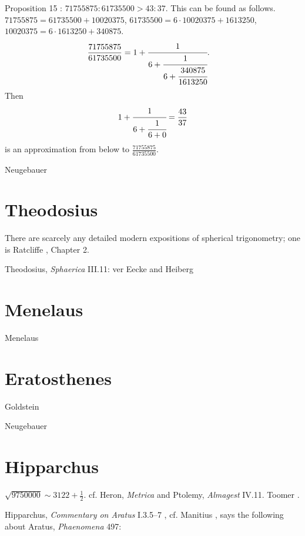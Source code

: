 \documentclass{article}
\theoremstyle{definition}
\begin{document}
Proposition 15 \cite[p.~407]{aristarchus}: $71755875:61735500>43:37$. This can be found as follows. 
$71755875 = 61735500+10020375$, $61735500 = 6\cdot 10020375 + 1613250$, $10020375 = 6\cdot 1613250+340875$. 
\begin{align*}
\frac{71755875}{61735500}&=1+\cfrac{1}{6+\cfrac{1}{6+\cfrac{340875}{1613250}}}.
\end{align*}
Then 
\[
1+\cfrac{1}{6+\cfrac{1}{6+0}}=\frac{43}{37}
\]
is an approximation from below to $\frac{71755875}{61735500}$. 



Neugebauer \cite{HAMA}







\section{Theodosius}
There are scarcely any detailed modern expositions of spherical trigonometry; one is Ratcliffe \cite{ratcliffe}, Chapter 2.



Theodosius, {\em Sphaerica} III.11: ver Eecke \cite{theodosius} and Heiberg \cite{heiberg1927}





\section{Menelaus}
Menelaus \cite{menelaos}







\section{Eratosthenes}
Goldstein \cite{goldstein}

Neugebauer \cite[pp.~336, 746--748]{HAMA}





\section{Hipparchus}
$\sqrt{9750000} \sim 3122 + \frac{1}{2}$. cf. Heron, {\em Metrica} \cite[pp.~18--20]{heronisIII}
and Ptolemy, {\em Almagest} IV.11. Toomer \cite[p.~211]{almagest}.

Hipparchus, {\em Commentary on Aratus} I.3.5--7 \cite[p.~]{heidel}, cf. Manitius \cite[p.~27]{manitius}, says
the following about Aratus, {\em Phaenomena} 497:
\end{document}
